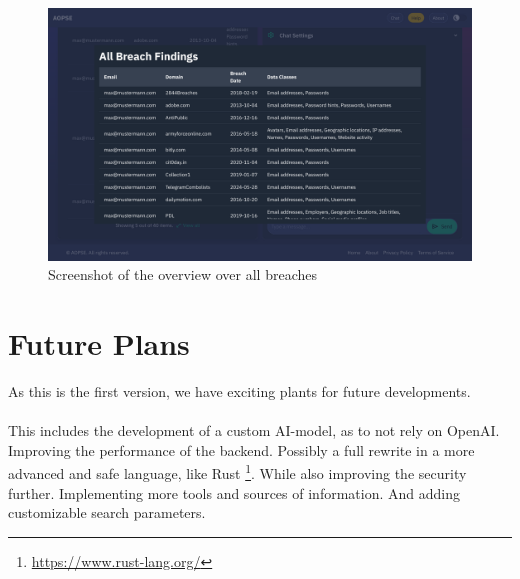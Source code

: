 \documentclass[
    a4paper,
    pagesize,
	pdftex,
    12pt,
]{scrartcl}
\begin{document}
\begin{figure}[H]
	\centering
	\includegraphics[width=15cm]{Frontend-breaches-overview.png}
	\caption{Screenshot of the overview over all breaches}
	\label{fig:frondent-breaches-overview}
\end{figure}

\section{Future Plans}
As this is the first version, we have exciting plants for future developments.
\\ \\
This includes the development of a custom AI-model, as to not rely on OpenAI. 
Improving the performance of the backend. Possibly a full rewrite in a more advanced and safe language, like Rust \footnote{\url{https://www.rust-lang.org/}}. 
While also improving the security further. 
Implementing more tools and sources of information. 
And adding customizable search parameters.

\newpage



\end{document}
